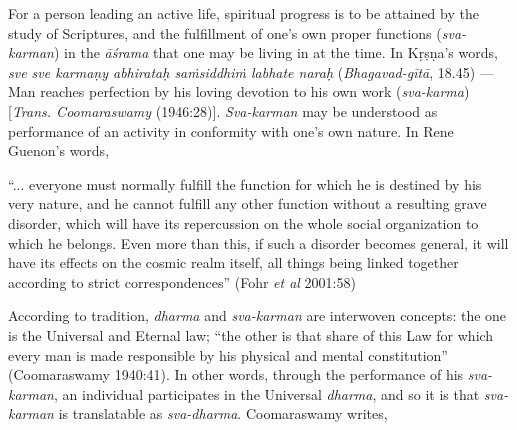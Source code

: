 For a person leading an active life, spiritual progress is to be attained by the study of Scriptures, and the fulfillment of one’s own proper functions ({\sl sva-karman}) in the {\sl āśrama} that one may be living in at the time. In Kṛṣṇa’s words, {\sl sve sve karmaṇy abhirataḥ saṁsiddhiṁ labhate naraḥ} ({\sl Bhagavad-gītā}, 18.45) — Man reaches perfection by his loving devotion to his own work ({\sl sva-karma}) [{\sl Trans. Coomaraswamy} (1946:28)]. {\sl Sva-karman} may be understood as performance of an activity in conformity with one’s own nature. In Rene Guenon’s words, 

\newpage

\begin{myquote}
“... everyone must normally fulfill the function for which he is destined by his very nature, and he cannot fulfill any other function without a resulting grave disorder, which will have its repercussion on the whole social organization to which he belongs. Even more than this, if such a disorder becomes general, it will have its effects on the cosmic realm itself, all things being linked together according to strict correspondences”
\hfill (Fohr {\sl et al} 2001:58)  
\end{myquote}

According to tradition, {\sl dharma} and {\sl sva-karman} are interwoven concepts: the one is the Universal and Eternal law; “the other is that share of this Law for which every man is made responsible by his physical and mental constitution” (Coomaraswamy 1940:41). In other words, through the performance of his {\sl sva-karman}, an individual participates in the Universal {\sl dharma}, and so it is that {\sl sva-karman} is translatable as {\sl sva-dharma}. Coomaraswamy writes, 


